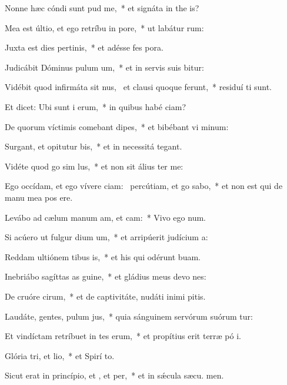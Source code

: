 \item Nonne hæc cóndi sunt pud me,~* et signáta in the is?
\item Mea est últio, et ego retríbu in pore,~* ut labátur  rum:
\item Juxta est dies pertinis,~* et adésse fes pora.
\item Judicábit Dóminus pulum um,~* et in servis suis bitur:
\item Vidébit quod infirmáta sit nus,~\pscross{} et clausi quoque ferunt,~* residuí ti sunt.
\item Et dicet: Ubi sunt i erum,~* in quibus habé ciam?
\item De quorum víctimis comebant dipes,~* et bibébant vi minum:
\item Surgant, et opitutur bis,~* et in necessitá  tegant.
\item Vidéte quod go sim lus,~* et non sit álius  ter me:
\item Ego occídam, et ego vívere ciam:~\pscross{} percútiam, et go sabo,~* et non est qui de manu mea pos ere.
\item Levábo ad cælum manum am, et cam:~* Vivo ego  num.
\item Si acúero ut fulgur dium um,~* et arripúerit judícium  a:
\item Reddam ultiónem tibus is,~* et his qui odérunt  buam.
\item Inebriábo sagíttas as guine,~* et gládius meus devo nes:
\item De cruóre cirum,~* et de captivitáte, nudáti inimi pitis.
\item Laudáte, gentes, pulum jus,~* quia sánguinem servórum suórum tur:
\item Et vindíctam retríbuet in tes erum,~* et propítius erit terræ pó i.
\item \singlecolsep
\item Glória tri, et lio,~* et Spirí to.
\item Sicut erat in princípio, et , et per,~* et in sǽcula sæcu. men.

